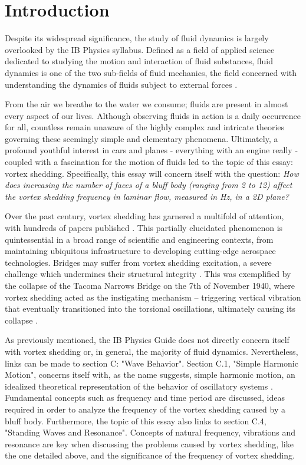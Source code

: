 \section{Introduction}

Despite its widespread significance, the study of fluid dynamics is largely overlooked by the IB Physics syllabus. Defined as a field of applied science dedicated to studying the motion and interaction of fluid substances, fluid dynamics is one of the two sub-fields of fluid mechanics, the field concerned with understanding the dynamics of fluids subject to external forces \parencite{livescience_fluid_dynamics}. 

From the air we breathe to the water we consume; fluids are present in almost every aspect of our lives. Although observing fluids in action is a daily occurrence for all, countless remain unaware of the highly complex and intricate theories governing these seemingly simple and elementary phenomena. Ultimately, a profound youthful interest in cars and planes - everything with an engine really - coupled with a fascination for the motion of fluids led to the topic of this essay: vortex shedding. Specifically, this essay will concern itself with the question: \textit{How does increasing the number of faces of a bluff body (ranging from 2 to 12) affect the vortex shedding frequency in laminar flow, measured in Hz, in a 2D plane?}

Over the past century, vortex shedding has garnered a multifold of attention, with hundreds of papers published \parencite[61]{buresti1998}. This partially elucidated phenomenon is quintessential in a broad range of scientific and engineering contexts, from maintaining ubiquitous infrastructure to developing cutting-edge aerospace technologies. Bridges may suffer from vortex shedding excitation, a severe challenge which undermines their structural integrity \parencite[1040]{jurado2012}. This was exemplified by the collapse of the Tacoma Narrows Bridge on the 7th of November 1940, where vortex shedding acted as the instigating mechanism -- triggering vertical vibration that eventually transitioned into the torsional oscillations, ultimately causing its collapse \parencite{tacoma_bridge_vibrations}.

As previously mentioned, the IB Physics Guide \parencite{ib_physics_2025} does not directly concern itself with vortex shedding or, in general, the majority of fluid dynamics. Nevertheless, links can be made to section C: "Wave Behavior". Section C.1, "Simple Harmonic Motion", concerns itself with, as the name suggests, simple harmonic motion, an idealized theoretical representation of the behavior of oscillatory systems \parencite[313]{allum2023}. Fundamental concepts such as frequency and time period are discussed, ideas required in order to analyze the frequency of the vortex shedding caused by a bluff body. Furthermore, the topic of this essay also links to section C.4, "Standing Waves and Resonance". Concepts of natural frequency, vibrations and resonance are key when discussing the problems caused by vortex shedding, like the one detailed above, and the significance of the frequency of vortex shedding. 





